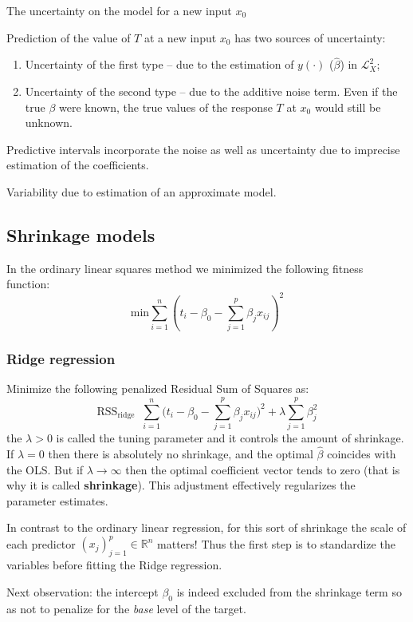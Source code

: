 \documentclass[a4paper]{article}
\newcommand{\brac}[1]{{\left ( #1 \right )}}
\newcommand{\Real}{\mathbb{R}}
\newcommand{\Lcal}{\mathcal{L}}
\newcommand{\RSS}{\text{RSS}}
\newcommand{\defn}{\mathop{\overset{\Delta}{=}}\nolimits}
\begin{document}
The uncertainty on the model for a new input $x_0$ 

Prediction of the value of $T$ at a new input $x_0$ has two sources of uncertainty:
\begin{enumerate}
	\item Uncertainty of the first type -- due to the estimation of $y(\cdot)$
	($\hat{\beta}$) in $\Lcal^2_X$;
	\item Uncertainty of the second type -- due to the additive noise term. Even
	if the true $\beta$ were known, the true values of the response $T$ at $x_0$
	would still be unknown.
\end{enumerate}
Predictive intervals incorporate the noise as well as uncertainty due to imprecise
estimation of the coefficients.

Variability due to estimation of an approximate model.

\subsection{Shrinkage models} %
\label{sub:shrinkage_models}

In the ordinary linear squares method we minimized the following fitness function:
\[\text{min} \sum_{i=1}^n \brac{t_i - \beta_0 - \sum_{j=1}^p \beta_j x_{ij}}^2\]

\subsubsection{Ridge regression} %
\label{ssub:ridge_regression}

Minimize the following penalized Residual Sum of Squares as:
\[\RSS_\text{ridge} \defn \sum_{i=1}^n \bigl(t_i - \beta_0 - \sum_{j=1}^p \beta_j x_{ij}\bigr)^2 + \lambda \sum_{j=1}^p \beta_j^2\]
the $\lambda>0$ is called the tuning parameter and it controls the amount of shrinkage.
If $\lambda = 0$ then there is absolutely no shrinkage, and the optimal $\hat{\beta}$
coincides with the OLS. But if $\lambda\to \infty$ then the optimal coefficient
vector tends to zero (that is why it is called \textbf{shrinkage}). This adjustment
effectively regularizes the parameter estimates.

In contrast to the ordinary linear regression, for this sort of shrinkage the scale
of each predictor $\brac{x_j}_{j=1}^p\in \Real^n$ matters! Thus the first step is
to standardize the variables before fitting the Ridge regression.

Next observation: the intercept $\beta_0$ is indeed excluded from the shrinkage
term so as not to penalize for the \emph{base} level of the target.
\end{document}
